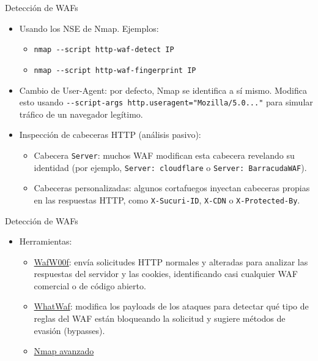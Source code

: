 \documentclass[aspectratio=169,11pt]{beamer}
\begin{document}
\begin{frame}{Detección de WAFs}
\small
  \begin{itemize}
  \item Usando los NSE de Nmap. Ejemplos:
    \begin{itemize}
    \item \verb|nmap --script http-waf-detect IP|
    \item \verb|nmap --script http-waf-fingerprint IP|
    \end{itemize}
  \item Cambio de User-Agent: por defecto, Nmap se identifica a sí mismo. Modifica esto usando \verb|--script-args http.useragent="Mozilla/5.0..."| para simular tráfico de un navegador legítimo.
  \item Inspección de cabeceras HTTP (análisis pasivo):
    \begin{itemize}
    \item Cabecera \verb|Server|: muchos WAF modifican esta cabecera revelando su identidad (por ejemplo, \verb|Server: cloudflare| o \verb|Server: BarracudaWAF|).
    \item Cabeceras personalizadas: algunos cortafuegos inyectan cabeceras propias en las respuestas HTTP, como \verb|X-Sucuri-ID|, \verb|X-CDN| o \verb|X-Protected-By|.
    \end{itemize}
  \end{itemize}
\end{frame}

\begin{frame}[allowframebreaks]{Detección de WAFs}
\small
  \begin{itemize}
  \item Herramientas:
    \begin{itemize}
    \item \href{https://github.com/EnableSecurity/wafw00f}{WafW00f}: envía solicitudes HTTP normales y alteradas para analizar las respuestas del servidor y las cookies, identificando casi cualquier WAF comercial o de código abierto.
    \item \href{https://github.com/Ekultek/WhatWaf}{WhatWaf}: modifica los payloads de los ataques para detectar qué tipo de reglas del WAF están bloqueando la solicitud y sugiere métodos de evasión (bypasses).
    \item \href{https://github.com/Y000o/Nmap/blob/main/Nmap_medio_Avanzado.md}{Nmap avanzado}
    \end{itemize}
  \end{itemize}
\end{frame}
\end{document}

